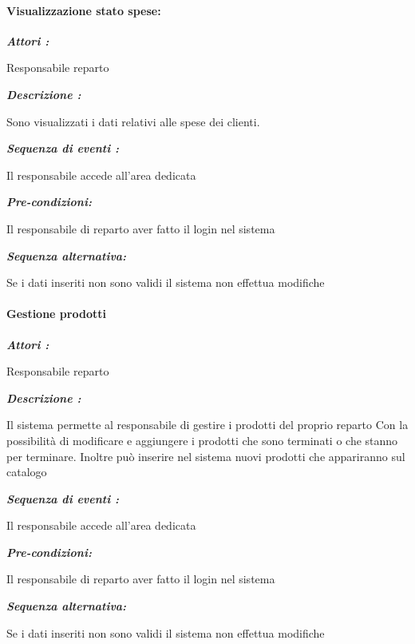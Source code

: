 \documentclass{article}
\begin{document}
\paragraph{Visualizzazione stato spese:}
\begin{mdframed}

	\noindent\textit{\textbf{Attori :}}


	Responsabile reparto

	\noindent\textit{\textbf{Descrizione :}}


	Sono visualizzati i dati relativi alle spese dei clienti.

	\noindent\textit{\textbf{Sequenza di eventi :}}


	Il responsabile accede all'area dedicata

	\noindent\textit{\textbf{Pre-condizioni:}}


	Il responsabile di reparto aver fatto il login nel sistema


	\noindent\textit{\textbf{Sequenza alternativa:}}


	Se i dati inseriti non sono validi il sistema non effettua modifiche

\end{mdframed}

\paragraph{Gestione prodotti}

\begin{mdframed}

	\noindent\textit{\textbf{Attori :}}


	Responsabile reparto

	\noindent\textit{\textbf{Descrizione :}}


	Il sistema permette al responsabile di gestire i prodotti del proprio reparto
	Con la possibilità di modificare e aggiungere i prodotti che sono terminati o che stanno
	per terminare.
	Inoltre può inserire nel sistema nuovi prodotti che appariranno sul catalogo 

	\noindent\textit{\textbf{Sequenza di eventi :}}


	Il responsabile accede all'area dedicata

	\noindent\textit{\textbf{Pre-condizioni:}}

	Il responsabile di reparto aver fatto il login nel sistema

	\noindent\textit{\textbf{Sequenza alternativa:}}


	Se i dati inseriti non sono validi il sistema non effettua modifiche
\end{mdframed}
\end{document}
